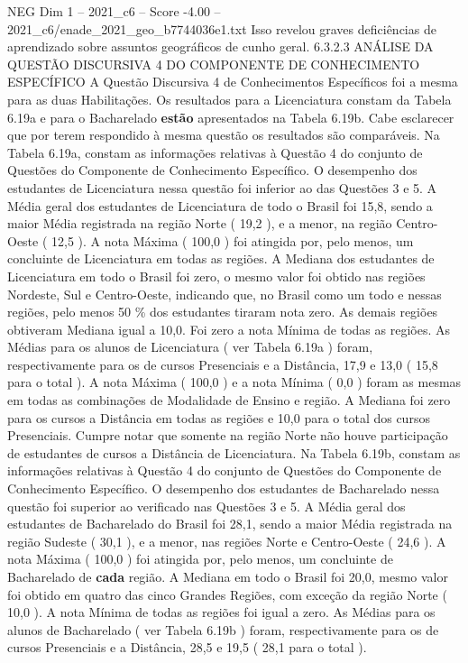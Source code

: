 \begin{textsample}{NEG Dim 1 – 2021\_c6 – Score -4.00 – 2021\_c6/enade\_2021\_geo\_b7744036e1.txt}
Isso revelou graves deficiências de aprendizado sobre assuntos geográficos de cunho geral. 6.3.2.3 ANÁLISE DA QUESTÃO DISCURSIVA 4 DO COMPONENTE DE CONHECIMENTO ESPECÍFICO A Questão Discursiva 4 de Conhecimentos Específicos foi a mesma para as duas Habilitações.
Os resultados para a Licenciatura constam da Tabela 6.19a e para o Bacharelado \textbf{estão} apresentados na Tabela 6.19b.
Cabe esclarecer que por terem respondido à mesma questão os resultados são comparáveis.
Na Tabela 6.19a, constam as informações relativas à Questão 4 do conjunto de Questões do Componente de Conhecimento Específico.
O desempenho dos estudantes de Licenciatura nessa questão foi inferior ao das Questões 3 e 5.
A Média geral dos estudantes de Licenciatura de todo o Brasil foi 15,8, sendo a maior Média registrada na região Norte ( 19,2 ), e a menor, na região Centro-Oeste ( 12,5 ).
A nota Máxima ( 100,0 ) foi atingida por, pelo menos, um concluinte de Licenciatura em todas as regiões.
A Mediana dos estudantes de Licenciatura em todo o Brasil foi zero, o mesmo valor foi obtido nas regiões Nordeste, Sul e Centro-Oeste, indicando que, no Brasil como um todo e nessas regiões, pelo menos 50 \% dos estudantes tiraram nota zero.
As demais regiões obtiveram Mediana igual a 10,0.
Foi zero a nota Mínima de todas as regiões.
As Médias para os alunos de Licenciatura ( ver Tabela 6.19a ) foram, respectivamente para os de cursos Presenciais e a Distância, 17,9 e 13,0 ( 15,8 para o total ).
A nota Máxima ( 100,0 ) e a nota Mínima ( 0,0 ) foram as mesmas em todas as combinações de Modalidade de Ensino e região.
A Mediana foi zero para os cursos a Distância em todas as regiões e 10,0 para o total dos cursos Presenciais.
Cumpre notar que somente na região Norte não houve participação de estudantes de cursos a Distância de Licenciatura.
Na Tabela 6.19b, constam as informações relativas à Questão 4 do conjunto de Questões do Componente de Conhecimento Específico.
O desempenho dos estudantes de Bacharelado nessa questão foi superior ao verificado nas Questões 3 e 5.
A Média geral dos estudantes de Bacharelado do Brasil foi 28,1, sendo a maior Média registrada na região Sudeste ( 30,1 ), e a menor, nas regiões Norte e Centro-Oeste ( 24,6 ).
A nota Máxima ( 100,0 ) foi atingida por, pelo menos, um concluinte de Bacharelado de \textbf{cada} região.
A Mediana em todo o Brasil foi 20,0, mesmo valor foi obtido em quatro das cinco Grandes Regiões, com exceção da região Norte ( 10,0 ).
A nota Mínima de todas as regiões foi igual a zero.
As Médias para os alunos de Bacharelado ( ver Tabela 6.19b ) foram, respectivamente para os de cursos Presenciais e a Distância, 28,5 e 19,5 ( 28,1 para o total ).

\end{textsample}
